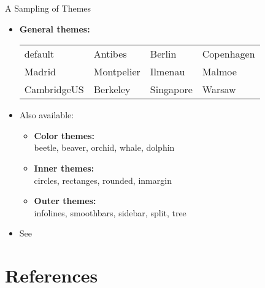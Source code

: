 \documentclass[pdf]{beamer}
\begin{document}
\begin{frame}[fragile]{A Sampling of Themes}
\begin{itemize}
\item \textbf{General themes:}
	\begin{tabular}{llll}
		default	&			Antibes			&	Berlin	&		Copenhagen \\
		Madrid	&			Montpelier	&	Ilmenau	&		Malmoe	\\
		CambridgeUS	&	Berkeley		&	Singapore	&	Warsaw	\\		
	\end{tabular}
\item Also available:
	\begin{itemize}
	\item \textbf{Color themes:} \\ beetle, beaver, orchid, whale, dolphin
	\item \textbf{Inner themes:} \\ circles, rectanges, rounded, inmargin
	\item \textbf{Outer themes:} \\ infolines, smoothbars, sidebar, split, tree
	\end{itemize}
\item See 
\end{itemize}
\end{frame}


\section*{References}
\end{document}
